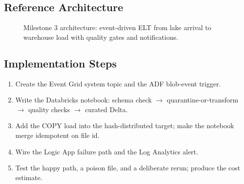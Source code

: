 \subsection*{Reference Architecture}
\begin{figure}[H]
    \centering
    \caption{Milestone 3 architecture: event-driven ELT from lake arrival to warehouse load with quality gates and notifications.}
    \label{fig:ch12-capstone-arch}
\end{figure}

\subsection*{Implementation Steps}
\begin{enumerate}
    \item Create the Event Grid system topic and the ADF blob-event trigger.
    \item Write the Databricks notebook: schema check $\rightarrow$ quarantine-or-transform $\rightarrow$ quality checks $\rightarrow$ curated Delta.
    \item Add the COPY load into the hash-distributed target; make the notebook merge idempotent on file id.
    \item Wire the Logic App failure path and the Log Analytics alert.
    \item Test the happy path, a poison file, and a deliberate rerun; produce the cost estimate.
\end{enumerate}

